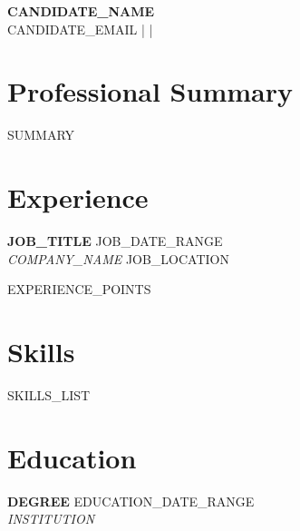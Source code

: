 \documentclass[10pt,letterpaper]{article}
\begin{document}
\pagestyle{empty}

\begin{center}
  {\LARGE\bfseries {{CANDIDATE_NAME}}}\\[4pt]
  {{CANDIDATE_EMAIL}} \quad| \quad|
\end{center}

\section{Professional Summary}
{{SUMMARY}}

\section{Experience}

\textbf{{{JOB_TITLE}}} \hfill {{JOB_DATE_RANGE}}\\
\textit{{{COMPANY_NAME}}} \hfill {{JOB_LOCATION}}

\begin{itemize}[leftmargin=*, itemsep=1pt, topsep=3pt, parsep=0pt]
{{EXPERIENCE_POINTS}}
\end{itemize}

\section{Skills}
{{SKILLS_LIST}}

\section{Education}
\textbf{{{DEGREE}}} \hfill {{EDUCATION_DATE_RANGE}}\\
\textit{{{INSTITUTION}}}
\end{document}
